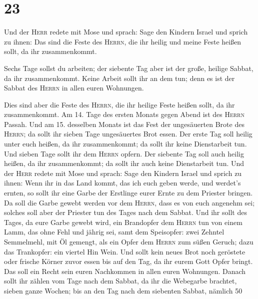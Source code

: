\hypertarget{section-22}{%
\section{23}\label{section-22}}

 Und der \textsc{Herr} redete mit Mose und sprach:
 Sage den Kindern Israel und sprich zu ihnen: Das sind die
Feste des \textsc{Herrn}, die ihr heilig und meine Feste heißen sollt,
da ihr zusammenkommt.

 Sechs Tage sollst du arbeiten; der siebente Tag aber ist
der große, heilige Sabbat, da ihr zusammenkommt. Keine Arbeit sollt ihr
an dem tun; denn es ist der Sabbat des \textsc{Herrn} in allen euren
Wohnungen.

 Dies sind aber die Feste des \textsc{Herrn}, die ihr
heilige Feste heißen sollt, da ihr zusammenkommt.  Am 14.
Tage des ersten Monats gegen Abend ist des \textsc{Herrn} Passah.
 Und am 15. desselben Monats ist das Fest der ungesäuerten
Brote des \textsc{Herrn}; da sollt ihr sieben Tage ungesäuertes Brot
essen.  Der erste Tag soll heilig unter euch heißen, da
ihr zusammenkommt; da sollt ihr keine Dienstarbeit tun. 
Und sieben Tage sollt ihr dem \textsc{Herrn} opfern. Der siebente Tag
soll auch heilig heißen, da ihr zusammenkommt; da sollt ihr auch keine
Dienstarbeit tun.  Und der \textsc{Herr} redete mit Mose
und sprach:  Sage den Kindern Israel und sprich zu ihnen:
Wenn ihr in das Land kommt, das ich euch geben werde, und werdet's
ernten, so sollt ihr eine Garbe der Erstlinge eurer Ernte zu dem
Priester bringen.  Da soll die Garbe gewebt werden vor
dem \textsc{Herrn}, dass es von euch angenehm sei; solches soll aber der
Priester tun des Tages nach dem Sabbat.  Und ihr sollt
des Tages, da eure Garbe gewebt wird, ein Brandopfer dem \textsc{Herrn}
tun von einem Lamm, das ohne Fehl und jährig sei,  samt
dem Speisopfer: zwei Zehntel Semmelmehl, mit Öl gemengt, als ein Opfer
dem \textsc{Herrn} zum süßen Geruch; dazu das Trankopfer: ein viertel
Hin Wein.  Und sollt kein neues Brot noch geröstete oder
frische Körner zuvor essen bis auf den Tag, da ihr eurem Gott Opfer
bringt. Das soll ein Recht sein euren Nachkommen in allen euren
Wohnungen.  Danach sollt ihr zählen vom Tage nach dem
Sabbat, da ihr die Webegarbe brachtet, sieben ganze Wochen;
 bis an den Tag nach dem siebenten Sabbat, nämlich 50
